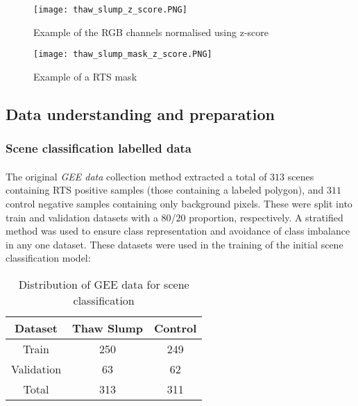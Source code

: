 \begin{figure}[hbt!]
    \begin{minipage}[c]{0.45\linewidth}
        \texttt{[image: thaw\_slump\_z\_score.PNG]}
        \caption{Example of the \gls{RGB} channels normalised using z-score}
        \label{thaw_slump_img}        
        \end{minipage}
        \hfill
        \begin{minipage}[c]{0.45\linewidth}
        \texttt{[image: thaw\_slump\_mask\_z\_score.PNG]}
        \caption{Example of a \gls{RTS} mask}
        \label{thaw_slump_mask}
    \end{minipage}
\end{figure}

\subsection{Data understanding and preparation} \label{dataprep}
\subsubsection{Scene classification labelled data}
\paragraph{}
The original \textit{\gls{GEE} data} collection method extracted a total of $313$ scenes containing \gls{RTS} positive samples (those containing a labeled polygon), and $311$ control negative samples containing only background pixels. These were split into train and validation datasets with a $80$/$20$ proportion, respectively. A stratified method was used to ensure class representation and avoidance of class imbalance in any one dataset. These datasets were used in the training of the initial scene classification model:
\begin{table}[ht!] 
    \begin{center}
    \begin{tabular}{c|c|c}    
    \textbf{Dataset} & \textbf{Thaw Slump} & \textbf{Control} \\
    \hline
    Train 
    &  250
    & 249  \\
    \hline
    Validation 
    &  63
    & 62  \\
    \hline
    Total 
    &  313
    & 311  \\
    \hline
    \end{tabular}
    \end{center}
    \caption{Distribution of \gls{GEE} data for scene classification}\label{table_label_data_class}
\end{table}
